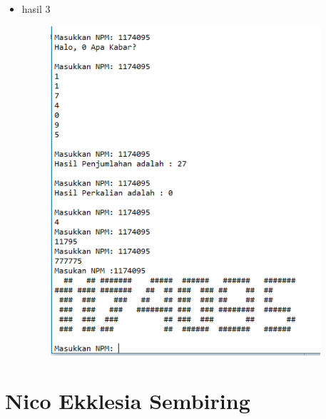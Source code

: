 \begin{itemize}
\begin{figure}[H]
		\centering
	\end{figure}
	\item hasil 3
	\begin{figure}[H]
		\includegraphics[width=10cm]{figures/dzihan/3.png}
		\centering
	\end{figure}
\end{itemize}

\section{Nico Ekklesia Sembiring}
